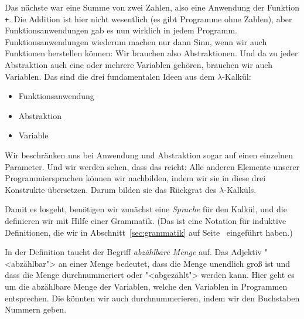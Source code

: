 Das nächste war eine Summe von zwei Zahlen, also eine Anwendung der
Funktion \lstinline{+}.  Die Addition ist hier nicht wesentlich (es
gibt Programme ohne Zahlen), aber Funktionsanwendungen gab es nun
wirklich in jedem Programm.  Funktionsanwendungen wiederum machen nur
dann Sinn, wenn wir auch Funktionen herstellen können: Wir brauchen
also Abstraktionen.  Und da zu jeder Abstraktion auch eine oder
mehrere Variablen gehören, brauchen wir auch Variablen.  Das sind die
drei fundamentalen Ideen aus dem $\lambda$-Kalkül:
%
\begin{itemize}
\item Funktionsanwendung
\item Abstraktion
\item Variable
\end{itemize}
%
Wir beschränken uns bei Anwendung und Abstraktion sogar auf einen
einzelnen Parameter.  Und wir werden sehen, dass das reicht: Alle
anderen Elemente unserer Programmiersprachen können wir nachbilden,
indem wir sie in diese drei Konstrukte übersetzen.  Darum bilden sie
das Rückgrat des $\lambda$-Kalküls.

Damit es losgeht, benötigen wir zunächst eine \textit{Sprache} für den
Kalkül, und die definieren wir mit Hilfe einer Grammatik.  (Das ist
eine Notation für induktive Definitionen, die wir in
Abschnitt~\ref{sec:grammatik} auf Seite~\pageref{sec:grammatik}
eingeführt haben.)

In der Definition taucht der Begriff \textit{abzählbare
  Menge} auf.  Das Adjektiv "<abzählbar"> an
einer Menge bedeutet, dass die Menge unendlich groß ist und dass die
Menge durchnummeriert oder "<abgezählt"> werden kann.  Hier geht es um
die abzählbare Menge der Variablen, welche den Variablen in Programmen
entsprechen.  Die könnten wir auch durchnummerieren, indem wir den
Buchstaben Nummern geben.

